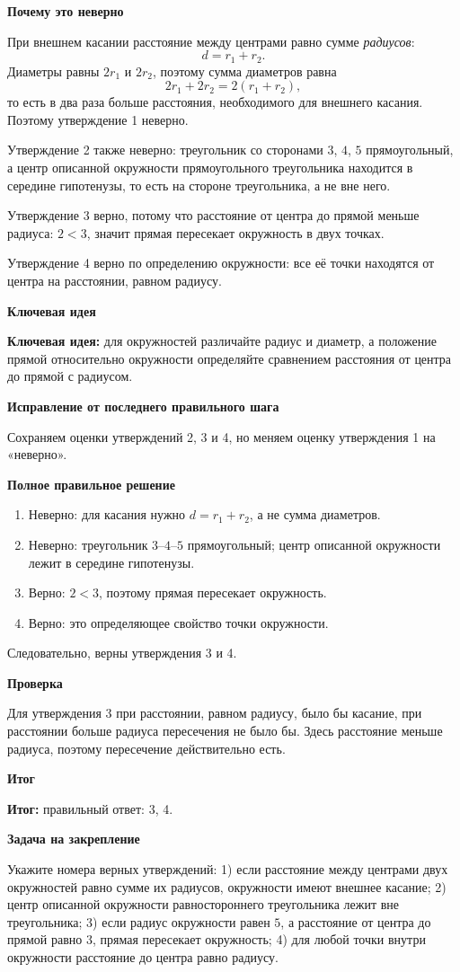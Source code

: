 \documentclass[12pt,a4paper]{article}
\newcommand{\keyidea}{\textcolor{blue!60!black}{\textbf{Ключевая идея:}}}
\newcommand{\resultlabel}{\textcolor{teal!60!black}{\textbf{Итог:}}}
\newcommand{\subhead}[1]{\par\medskip\textbf{#1}\par}
\begin{document}
\subhead{Почему это неверно}
При внешнем касании расстояние между центрами равно сумме \emph{радиусов}:
\[
d=r_1+r_2.
\]
Диаметры равны $2r_1$ и $2r_2$, поэтому сумма диаметров равна
\[
2r_1+2r_2=2(r_1+r_2),
\]
то есть в два раза больше расстояния, необходимого для внешнего касания. Поэтому утверждение 1 неверно.

Утверждение 2 также неверно: треугольник со сторонами $3$, $4$, $5$ прямоугольный, а центр описанной окружности прямоугольного треугольника находится в середине гипотенузы, то есть на стороне треугольника, а не вне него.

Утверждение 3 верно, потому что расстояние от центра до прямой меньше радиуса: $2<3$, значит прямая пересекает окружность в двух точках.

Утверждение 4 верно по определению окружности: все её точки находятся от центра на расстоянии, равном радиусу.

\subhead{Ключевая идея}
\keyidea{} для окружностей различайте радиус и диаметр, а положение прямой относительно окружности определяйте сравнением расстояния от центра до прямой с радиусом.

\subhead{Исправление от последнего правильного шага}
Сохраняем оценки утверждений 2, 3 и 4, но меняем оценку утверждения 1 на «неверно».

\subhead{Полное правильное решение}
\begin{enumerate}
\item Неверно: для касания нужно $d=r_1+r_2$, а не сумма диаметров.
\item Неверно: треугольник $3$--$4$--$5$ прямоугольный; центр описанной окружности лежит в середине гипотенузы.
\item Верно: $2<3$, поэтому прямая пересекает окружность.
\item Верно: это определяющее свойство точки окружности.
\end{enumerate}
Следовательно, верны утверждения 3 и 4.

\subhead{Проверка}
Для утверждения 3 при расстоянии, равном радиусу, было бы касание, при расстоянии больше радиуса пересечения не было бы. Здесь расстояние меньше радиуса, поэтому пересечение действительно есть.

\subhead{Итог}
\resultlabel{} правильный ответ: 3, 4.

\subhead{Задача на закрепление}
Укажите номера верных утверждений: 1) если расстояние между центрами двух окружностей равно сумме их радиусов, окружности имеют внешнее касание; 2) центр описанной окружности равностороннего треугольника лежит вне треугольника; 3) если радиус окружности равен $5$, а расстояние от центра до прямой равно $3$, прямая пересекает окружность; 4) для любой точки внутри окружности расстояние до центра равно радиусу.
\end{document}
